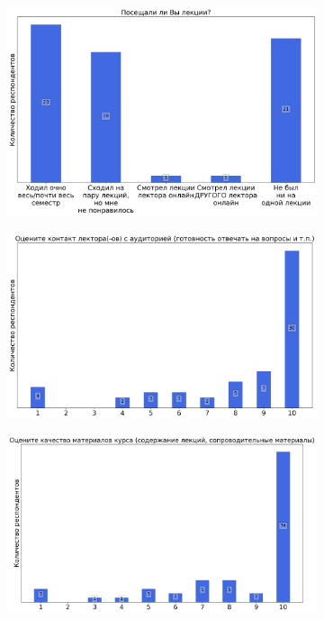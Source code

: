 		\begin{figure}[H]
			\centering
            \begin{subfigure}[b]{0.45\textwidth}
				\centering
				\includegraphics[width=\textwidth]{images/1 course/БЖД/lecturer-questions-0.png}
			\end{subfigure}
			\begin{subfigure}[b]{0.45\textwidth}
				\centering
				\includegraphics[width=\textwidth]{images/1 course/БЖД/lecturer-marks-0.png}
			\end{subfigure}
			\begin{subfigure}[b]{0.45\textwidth}
				\centering
				\includegraphics[width=\textwidth]{images/1 course/БЖД/lecturer-marks-1.png}

\end{subfigure}
\end{figure}
